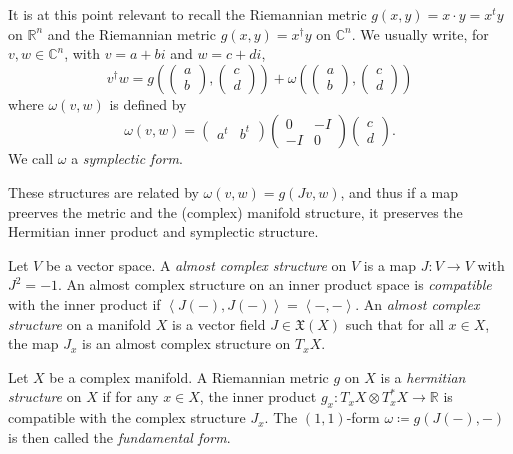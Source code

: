 It is at this point relevant to recall the Riemannian metric $g(x,y)=x\cdot y=x^ty$ on $\mathbb{R} ^n$ and the Riemannian metric $g(x,y)=x^\dagger y$ on $\mathbb{C} ^n$. We usually write, for $v,w\in\mathbb{C} ^n$, with $v=a+bi$ and $w=c+di$,
\[
	v^\dagger w = g\left( \begin{pmatrix}
	a \\
	b
	\end{pmatrix},\begin{pmatrix}
	c \\
	d
	\end{pmatrix} \right) +\omega \left( \begin{pmatrix}
	a \\
	b
	\end{pmatrix},\begin{pmatrix}
	c \\
	d
	\end{pmatrix}\right) 
\]
where $\omega (v,w)$ is defined by
\[
	\omega (v,w)=\begin{pmatrix}
		a^t & b^t
	\end{pmatrix}\begin{pmatrix}
	0 & -I \\
	-I & 0
	\end{pmatrix}\begin{pmatrix}
	c \\
	d
	\end{pmatrix}
.\]
We call $\omega $ a \emph{symplectic form}.

These structures are related by $\omega (v,w)=g(Jv,w)$, and thus if a map preerves the metric and the (complex) manifold structure, it preserves the Hermitian inner product and symplectic structure.

\begin{definition}\label{1.1.5}
	Let $V$ be a vector space. A \emph{almost complex structure} on $V$ is a map $J : V \to V$ with $J^2=-1$. An almost complex structure on an inner product space is \emph{compatible} with the inner product if $\left\langle J(-),J(-) \right\rangle =\left\langle -,- \right\rangle $. An \emph{almost complex structure} on a manifold $X$ is a vector field $J\in \mathfrak{X} (X)$ such that for all $x\in X$, the map $J_x$ is an almost complex structure on $T_xX$.
\end{definition}


\begin{definition}\label{1.1.6}
	Let $X$ be a complex manifold. A Riemannian metric $g$ on $X$ is a \emph{hermitian structure} on $X$ if for any $x\in X$, the inner product $g_x : T_xX\otimes T^*_xX \to \mathbb{R} $ is compatible with the complex structure $J_x$. The $(1,1)$-form $\omega \coloneqq g(J(-),-)$ is then called the \emph{fundamental form}.
\end{definition}

